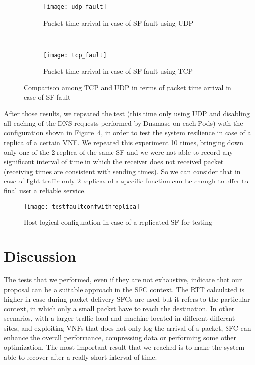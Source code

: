 \begin{figure}[]
    \begin{subfigure}[b]{0.9\textwidth}
        \texttt{[image: udp\_fault]}
        \caption{Packet time arrival in case of SF fault using UDP}
        \label{chap:tests:sec:fault:img:faultgraphudp}
    \end{subfigure}
    \\
    \begin{subfigure}[b]{0.9\textwidth}
        \texttt{[image: tcp\_fault]}
        \caption{Packet time arrival in case of SF fault using TCP}
        \label{chap:tests:sec:fault:img:faultgraphtcp}
    \end{subfigure}
    \caption{Comparison among TCP and UDP in terms of packet time arrival in
    case of SF fault}
    \label{chap:tests:sec:fault:img:faultgrapht}
\end{figure}

After those results, we repeated the test (this time only using UDP and
disabling all caching of the DNS requests performed by Dnsmasq on each Pods)
with the configuration shown in
Figure~\ref{chap:tests:sec:fault:img:testfaultconfwithreplica}, in order to
test the system resilience in case of a replica of a certain VNF. We repeated
this experiment 10 times, bringing down only one of the 2 replica of the same
SF and we were not able to record any significant interval of time in which the
receiver does not received packet (receiving times are consistent with sending
times). So we can consider that in case of light traffic only 2 replicas of a
specific function can be enough to offer to final user a reliable service.

\begin{figure}[H]
  \centering
  \texttt{[image: testfaultconfwithreplica]}
  \caption{Host logical configuration in case of a replicated SF for testing}
  \label{chap:tests:sec:fault:img:testfaultconfwithreplica}
\end{figure}

\section{Discussion}
The tests that we performed, even if they are not exhaustive, indicate that our
proposal can be a suitable approach in the SFC context.
The RTT calculated is higher in case during packet delivery SFCs are used
but it refers to the particular context, in which only a small packet have to
reach the destination. In other scenarios, with a larger traffic load and
machine located in different different sites, and exploiting VNFs that does not
only log the arrival of a packet, SFC can enhance the overall performance,
compressing data or performing some other optimization. The most important
result that we reached is to make the system able to recover after a really
short interval of time.